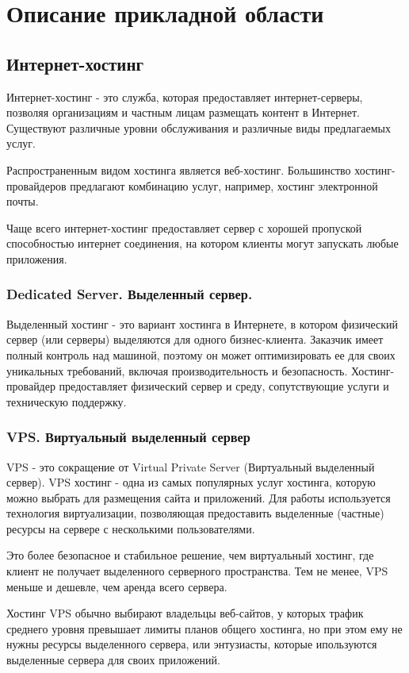\chapter{Описание прикладной области}\label{ch:ch1}
\section{Интернет-хостинг}\label{sec:ch1/sec1}
Интернет-хостинг - это служба, которая предоставляет интернет-серверы, позволяя организациям и частным лицам размещать контент в Интернет. Существуют различные уровни обслуживания и различные виды предлагаемых услуг.

Распространенным видом хостинга является веб-хостинг. Большинство хостинг-провайдеров предлагают комбинацию услуг, например, хостинг электронной почты.

Чаще всего интернет-хостинг предоставляет сервер с хорошей пропуской способностью интернет соединения, на котором клиенты могут запускать любые приложения.

\subsection{Dedicated Server. Выделенный сервер.}\label{sec:ds_hosting}
Выделенный хостинг - это вариант хостинга в Интернете, в котором физический сервер (или серверы) выделяются для одного бизнес-клиента. Заказчик имеет полный контроль над машиной, поэтому он может оптимизировать ее для своих уникальных требований, включая производительность и безопасность. Хостинг-провайдер предоставляет физический сервер и среду, сопутствующие услуги и техническую поддержку.

\subsection{VPS. Виртуальный выделенный сервер}\label{sec:vps_hosting}
VPS - это сокращение от Virtual Private Server (Виртуальный выделенный сервер). VPS хостинг - одна из самых популярных услуг хостинга, которую можно выбрать для размещения сайта и приложений. Для работы используется технология виртуализации, позволяющая предоставить выделенные (частные) ресурсы на сервере с несколькими пользователями.

Это более безопасное и стабильное решение, чем виртуальный хостинг, где клиент не получает выделенного серверного пространства. Тем не менее, VPS меньше и дешевле, чем аренда всего сервера.

Хостинг VPS обычно выбирают владельцы веб-сайтов, у которых трафик среднего уровня превышает лимиты планов общего хостинга, но при этом ему не нужны ресурсы выделенного сервера, или энтузиасты, которые ипользуются выделенные сервера для своих приложений.

